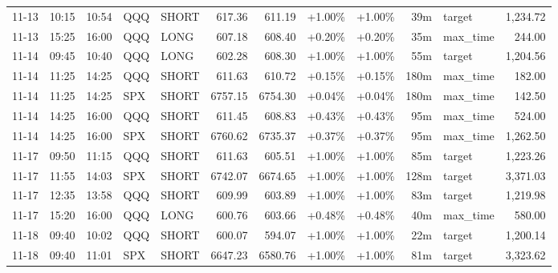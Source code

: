 \documentclass[11pt,a4paper,twoside]{article}
\begin{document}
\begin{center}
\begin{longtable}{>{\color{txtmain}}l l l l l r r r r r >{\color{txtmain}}l r}
11-13 & 10:15 & 10:54 & QQQ & SHORT & 617.36 & 611.19 & \textcolor{wingreen}{+1.00\%} & \textcolor{wingreen}{+1.00\%} & 39m & target & \textcolor{wingreen}{1,234.72} \\
11-13 & 15:25 & 16:00 & QQQ & LONG & 607.18 & 608.40 & \textcolor{wingreen}{+0.20\%} & \textcolor{wingreen}{+0.20\%} & 35m & max\_time & \textcolor{wingreen}{244.00} \\
11-14 & 09:45 & 10:40 & QQQ & LONG & 602.28 & 608.30 & \textcolor{wingreen}{+1.00\%} & \textcolor{wingreen}{+1.00\%} & 55m & target & \textcolor{wingreen}{1,204.56} \\
11-14 & 11:25 & 14:25 & QQQ & SHORT & 611.63 & 610.72 & \textcolor{wingreen}{+0.15\%} & \textcolor{wingreen}{+0.15\%} & 180m & max\_time & \textcolor{wingreen}{182.00} \\
11-14 & 11:25 & 14:25 & SPX & SHORT & 6757.15 & 6754.30 & \textcolor{wingreen}{+0.04\%} & \textcolor{wingreen}{+0.04\%} & 180m & max\_time & \textcolor{wingreen}{142.50} \\
11-14 & 14:25 & 16:00 & QQQ & SHORT & 611.45 & 608.83 & \textcolor{wingreen}{+0.43\%} & \textcolor{wingreen}{+0.43\%} & 95m & max\_time & \textcolor{wingreen}{524.00} \\
11-14 & 14:25 & 16:00 & SPX & SHORT & 6760.62 & 6735.37 & \textcolor{wingreen}{+0.37\%} & \textcolor{wingreen}{+0.37\%} & 95m & max\_time & \textcolor{wingreen}{1,262.50} \\
11-17 & 09:50 & 11:15 & QQQ & SHORT & 611.63 & 605.51 & \textcolor{wingreen}{+1.00\%} & \textcolor{wingreen}{+1.00\%} & 85m & target & \textcolor{wingreen}{1,223.26} \\
11-17 & 11:55 & 14:03 & SPX & SHORT & 6742.07 & 6674.65 & \textcolor{wingreen}{+1.00\%} & \textcolor{wingreen}{+1.00\%} & 128m & target & \textcolor{wingreen}{3,371.03} \\
11-17 & 12:35 & 13:58 & QQQ & SHORT & 609.99 & 603.89 & \textcolor{wingreen}{+1.00\%} & \textcolor{wingreen}{+1.00\%} & 83m & target & \textcolor{wingreen}{1,219.98} \\
11-17 & 15:20 & 16:00 & QQQ & LONG & 600.76 & 603.66 & \textcolor{wingreen}{+0.48\%} & \textcolor{wingreen}{+0.48\%} & 40m & max\_time & \textcolor{wingreen}{580.00} \\
11-18 & 09:40 & 10:02 & QQQ & SHORT & 600.07 & 594.07 & \textcolor{wingreen}{+1.00\%} & \textcolor{wingreen}{+1.00\%} & 22m & target & \textcolor{wingreen}{1,200.14} \\
11-18 & 09:40 & 11:01 & SPX & SHORT & 6647.23 & 6580.76 & \textcolor{wingreen}{+1.00\%} & \textcolor{wingreen}{+1.00\%} & 81m & target & \textcolor{wingreen}{3,323.62} \\

\end{longtable}
\end{center}
\end{document}
